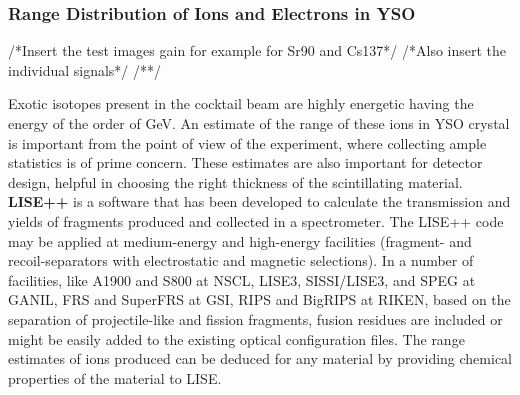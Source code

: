 \documentclass[a4paper,12pt,twoside]{report}
\begin{document}
\subsubsection{Range Distribution of Ions and Electrons in YSO}


/*Insert the test images gain for example for Sr90 and Cs137*/
/*Also insert the individual signals*/
/**/

Exotic isotopes present in the cocktail beam are highly energetic having the energy of the order of GeV. An estimate of the range of these ions in YSO crystal is important from the point of view of the experiment, where collecting ample statistics is of prime concern. These estimates are also important for detector design, helpful in choosing the right thickness of the scintillating material. \textbf{LISE++} \cite{lise} is a software that has been developed to calculate the transmission and yields of fragments produced and collected in a spectrometer. The LISE++ code may be applied at medium-energy and high-energy facilities (fragment- and recoil-separators with electrostatic and magnetic selections). In a number of facilities, like A1900 and S800 at NSCL, LISE3, SISSI/LISE3, and SPEG at GANIL, FRS and SuperFRS at GSI,  RIPS and BigRIPS at RIKEN, based on the separation of projectile-like and fission fragments,  fusion residues are included or might be easily added to the existing optical configuration files. The range estimates of ions produced can be deduced for any material by providing chemical properties of the material to LISE.
\newpage
\end{document}
